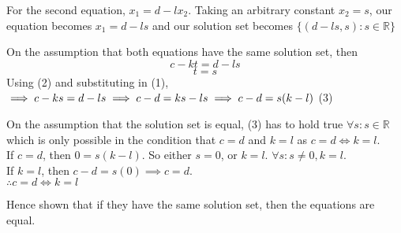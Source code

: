 \documentclass[addpoints]{exam}
\begin{document}
\begin{questions}
\begin{solution}
        For the second equation, $ x_1 = d - lx_2 $. Taking an arbitrary constant $ x_2 = s $, our equation becomes $ x_1 = d - ls $ and our solution set becomes $ \{ (d - ls, s) : s \in \mathbb{R} \} $

        On the assumption that both equations have the same solution set, then
        \begin{equation} \label{eq1}
            c - kt = d - ls
        \end{equation}
        \begin{equation} \label{eq2}
            t = s
        \end{equation}
        Using (2) and substituting in (1),\\ $\implies c - ks = d - ls \\ \implies c - d = ks - ls \\ \implies c - d = s(k - l) $ (3)


        On the assumption that the solution set is equal, (3) has to hold true $ \forall s : s \in \mathbb{R} $ which is only possible in the condition that $ c = d $ and $ k = l $ as $ c = d \iff k = l $. \\ 
        If $ c = d $, then $ 0 = s(k - l) $. So either $ s = 0 $, or $ k = l $. $ \forall s : s \neq 0, k = l $. \\ 
        If $ k = l $, then $ c - d = s(0) \implies c = d $. \\ 
        $ \therefore c = d \iff k = l $ 
        
        Hence shown that if they have the same solution set, then the equations are equal.
    \end{solution}
\end{questions}
\end{document}
